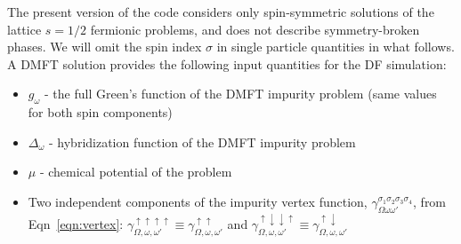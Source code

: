 \documentclass[3p,times,procedia]{elsarticle}
\begin{document}
The present version of the code considers only spin-symmetric solutions of the lattice $s=1/2$ fermionic problems, and does not describe symmetry-broken phases. We will omit the spin index $\sigma$ in single particle quantities in what follows.
A DMFT solution provides the following input quantities for the DF simulation:
\begin{itemize}
\item $g_\omega$ - the full Green's function of the DMFT impurity problem (same values for both spin components)
\item $\Delta_{\omega}$ - hybridization function of the DMFT impurity problem
\item $\mu$ - chemical potential of the problem
\item Two independent components of the impurity vertex function, $\gamma_{\Omega\omega\omega'}^{\sigma_1\sigma_2\sigma_3\sigma_4}$, from Eqn~\eqref{eqn:vertex}: $\gamma_{\Omega,\omega,\omega'}^{\uparrow\uparrow\uparrow\uparrow} \equiv \gamma^{\uparrow\uparrow}_{\Omega,\omega,\omega'} $ and $\gamma_{\Omega,\omega,\omega'}^{\uparrow\downarrow\downarrow\uparrow} \equiv  \gamma^{\uparrow\downarrow}_{\Omega,\omega,\omega'} $
\end{itemize}
\end{document}
